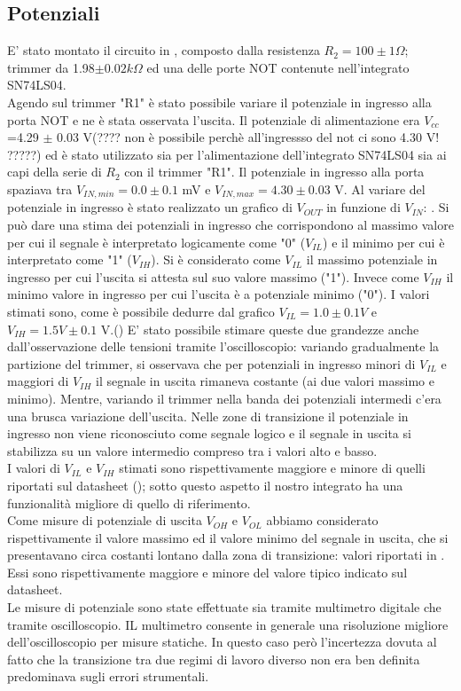 \subsection{Potenziali}
E' stato montato il circuito in , composto dalla resistenza $R_{2}=100 \pm 1 \Omega$; trimmer da 1.98$\pm 0.02 k\Omega$ ed una delle porte NOT contenute nell'integrato SN74LS04.\\
 Agendo sul trimmer "R1" è stato possibile variare il potenziale in ingresso alla porta NOT e ne è stata osservata l'uscita. Il potenziale di alimentazione era $V_{cc}$=4.29 $\pm$ 0.03 V(???? non è possibile perchè all'ingressso del not ci sono 4.30 V! ?????) ed è stato utilizzato sia per l'alimentazione dell'integrato SN74LS04 sia ai capi della serie di $R_2$ con il trimmer "R1". Il potenziale in ingresso alla porta spaziava tra $V_{IN,min}=0.0 \pm 0.1$ mV e $V_{IN,max}=4.30 \pm 0.03$ V. Al variare del potenziale in ingresso è stato realizzato un grafico di $V_{OUT}$ in funzione di $V_{IN}$: . Si può dare una stima dei potenziali in ingresso che corrispondono al massimo valore per cui il segnale è interpretato logicamente come "0" ($V_{IL}$) e il minimo per cui è interpretato come "1" ($V_{IH}$). Si è considerato come $V_{IL}$ il massimo potenziale in ingresso per cui l'uscita si attesta sul suo valore massimo ("1"). Invece come $V_{IH}$ il minimo valore in ingresso per cui l'uscita è a potenziale minimo ("0"). I valori stimati sono, come è possibile dedurre dal grafico   $V_{IL}=1.0 \pm 0.1 V$ e $V_{IH}=1.5V \pm 0.1$ V.()
 E' stato possibile stimare queste due grandezze anche dall'osservazione delle tensioni tramite l'oscilloscopio: variando gradualmente la partizione del trimmer, si osservava che per potenziali in ingresso minori di $V_{IL}$ e maggiori di $V_{IH}$ il segnale in uscita rimaneva costante (ai due valori massimo e minimo). Mentre, variando il trimmer nella banda dei potenziali intermedi c'era una brusca variazione dell'uscita. Nelle zone di transizione il potenziale in ingresso  non viene riconosciuto come segnale logico e il segnale in uscita si stabilizza su un valore intermedio compreso tra i valori alto e basso.\\ 
 I valori di  $V_{IL}$ e $V_{IH}$ stimati sono rispettivamente maggiore e minore di quelli riportati sul datasheet (); sotto questo aspetto il nostro integrato ha una funzionalità migliore di quello di riferimento. \\
Come misure di potenziale di uscita $V_{OH}$ e $V_{OL}$ abbiamo considerato rispettivamente il valore massimo ed il valore minimo del segnale in uscita, che si presentavano circa costanti lontano dalla zona di transizione: valori riportati in .  Essi sono rispettivamente maggiore e minore del valore tipico indicato sul datasheet.\\
Le misure di potenziale sono state effettuate sia tramite multimetro digitale che tramite oscilloscopio. IL multimetro consente in generale una risoluzione migliore dell'oscilloscopio per misure statiche. In questo caso però l'incertezza dovuta al fatto che la transizione tra due regimi di lavoro diverso non era ben definita predominava sugli errori strumentali.
